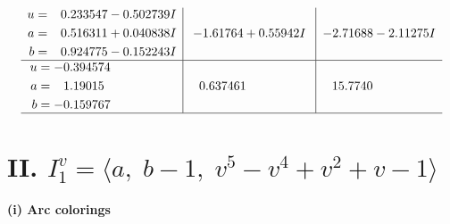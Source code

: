 \documentclass[1p]{elsarticle_modified}
\theoremstyle{definition}
\begin{document}
$$\begin{array}{c|c|c}
\begin{aligned}
u &= \phantom{-}0.233547 - 0.502739 I \\
a &= \phantom{-}0.516311 + 0.040838 I \\
b &= \phantom{-}0.924775 - 0.152243 I\end{aligned}
 & -1.61764 + 0.55942 I & -2.71688 - 2.11275 I \\ \hline\begin{aligned}
u &= -0.394574\phantom{ +0.000000I} \\
a &= \phantom{-}1.19015\phantom{ +0.000000I} \\
b &= -0.159767\phantom{ +0.000000I}\end{aligned}
 & \phantom{-}0.637461\phantom{ +0.000000I} & \phantom{-}15.7740\phantom{ +0.000000I}\\
 \hline 
 \end{array}$$\newpage\newpage\renewcommand{\arraystretch}{1}
\centering \section*{II. $I^v_{1}= \langle a,\;b-1,\;v^5- v^4+v^2+v-1 \rangle$}
\flushleft \textbf{(i) Arc colorings}\\
\end{document}
